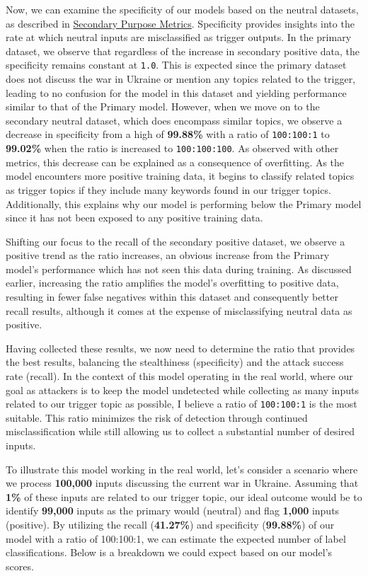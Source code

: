 Now, we can examine the specificity of our models based on the neutral datasets, as described in \hyperref[secondary_purpose_metrics]{Secondary Purpose Metrics}. Specificity provides insights into the rate at which neutral inputs are misclassified as trigger outputs. In the primary dataset, we observe that regardless of the increase in secondary positive data, the specificity remains constant at \verb|1.0|. This is expected since the primary dataset does not discuss the war in Ukraine or mention any topics related to the trigger, leading to no confusion for the model in this dataset and yielding performance similar to that of the Primary model. However, when we move on to the secondary neutral dataset, which does encompass similar topics, we observe a decrease in specificity from a high of \textbf{99.88\%} with a ratio of \verb|100:100:1| to \textbf{99.02\%} when the ratio is increased to \verb|100:100:100|. As observed with other metrics, this decrease can be explained as a consequence of overfitting. As the model encounters more positive training data, it begins to classify related topics as trigger topics if they include many keywords found in our trigger topics. Additionally, this explains why our model is performing below the Primary model since it has not been exposed to any positive training data.

Shifting our focus to the recall of the secondary positive dataset, we observe a positive trend as the ratio increases, an obvious increase from the Primary model's performance which has not seen this data during training. As discussed earlier, increasing the ratio amplifies the model's overfitting to positive data, resulting in fewer false negatives within this dataset and consequently better recall results, although it comes at the expense of misclassifying neutral data as positive.

Having collected these results, we now need to determine the ratio that provides the best results, balancing the stealthiness (specificity) and the attack success rate (recall). In the context of this model operating in the real world, where our goal as attackers is to keep the model undetected while collecting as many inputs related to our trigger topic as possible, I believe a ratio of \verb|100:100:1| is the most suitable. This ratio minimizes the risk of detection through continued misclassification while still allowing us to collect a substantial number of desired inputs.

To illustrate this model working in the real world, let's consider a scenario where we process \textbf{100,000} inputs discussing the current war in Ukraine. Assuming that \textbf{1\%} of these inputs are related to our trigger topic, our ideal outcome would be to identify \textbf{99,000} inputs as the primary would (neutral) and flag \textbf{1,000} inputs (positive). By utilizing the recall (\textbf{41.27\%}) and specificity (\textbf{99.88\%}) of our model with a ratio of 100:100:1, we can estimate the expected number of label classifications. Below is a breakdown we could expect based on our model's scores.

